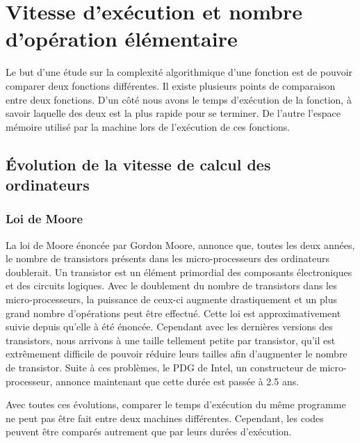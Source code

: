 \documentclass[12pt, twoside, openright]{report}
\begin{document}
\section{Vitesse d'exécution et nombre d'opération élémentaire}
Le but d'une étude sur la complexité algorithmique d'une fonction est de pouvoir comparer deux fonctions différentes. Il existe plusieurs points de comparaison entre deux fonctions. D'un côté nous avons le temps d'exécution de la fonction, à savoir laquelle des deux est la plus rapide pour se terminer. De l'autre l'espace mémoire utilisé par la machine lors de l'exécution de ces fonctions. 



\subsection{Évolution de la vitesse de calcul des ordinateurs}

\subsubsection{Loi de Moore}

La loi de Moore énoncée par Gordon Moore, annonce que, toutes les deux années, le nombre de transistors présents dans les micro-processeurs des ordinateurs doublerait. Un transistor est un élément primordial des composants électroniques et des circuits logiques. Avec le doublement du nombre de transistors dans les micro-processeurs, la puissance de ceux-ci augmente drastiquement et un plus grand nombre d'opérations peut être effectué. Cette loi est approximativement suivie depuis qu'elle à été énoncée. Cependant avec les dernières versions des transistors, nous arrivons à une taille tellement petite par transistor, qu'il est extrêmement difficile de pouvoir réduire leurs tailles afin d'augmenter le nombre de transistor. Suite à ces problèmes, le PDG de Intel, un constructeur de micro-processeur, annonce maintenant que cette durée est passée à 2.5 ans.\cite{moore01} 

Avec toutes ces évolutions, comparer le temps d'exécution du même programme ne peut pas être fait entre deux machines différentes. Cependant, les codes peuvent être comparés autrement que par leurs durées d'exécution.

\end{document}
